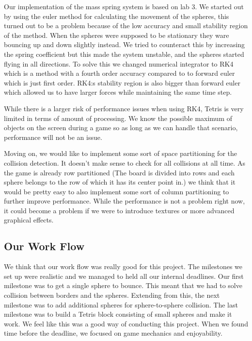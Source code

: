 \documentclass[11pt]{article} %
\begin{document}
Our implementation of the mass spring system is based on lab 3. We started out by using the euler method for calculating the movement of the spheres, this turned out to be a problem because of the low accuracy and small stability region of the method. When the spheres were supposed to be stationary they ware bouncing up and down slightly instead. We tried to counteract this by increasing the spring coefficient but this made the system unstable, and the spheres started flying in all directions. To solve this we changed numerical integrator to RK4 which is a method with a fourth order accuracy compared to to forward euler which is just first order. RK4:s stability region is also bigger than forward euler which allowed us to have larger forces while maintaining the same time step.

While there is a larger risk of performance issues when using RK4, Tetris is very limited in terms of amount of processing. We know the possible maximum of objects on the screen during a game so as long as we can handle that scenario, performance will not be an issue.

Moving on, we would like to implement some sort of space partitioning for the collision detection. It doesn't make sense to check for all collisions at all time. As the game is already row partitioned (The board is divided into rows and each sphere belongs to the row of which it has its center point in.) we think that it would be pretty easy to also implement some sort of column partitioning to further improve performance. While the performance is not a problem right now, it could become a problem if we were to introduce textures or more advanced graphical effects.

\subsection{Our Work Flow}
We think that our work flow was really good for this project. The milestones we set up were realistic and we managed to held all our internal deadlines. Our first milestone was to get a single sphere to bounce. This meant that we had to solve collision between borders and the spheres. Extending from this, the next milestone was to add additional spheres for sphere-to-sphere collision. The last milestone was to build a Tetris block consisting of small spheres and make it work. We feel like this was a good way of conducting this project. When we found time before the deadline, we focused on game mechanics and enjoyability.
\end{document}
